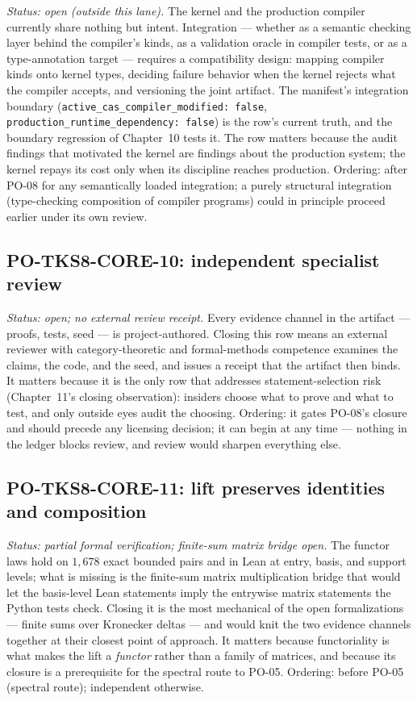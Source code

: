 \emph{Status: open (outside this lane).} The kernel and the
production compiler currently share nothing but intent. Integration
--- whether as a semantic checking layer behind the compiler's kinds,
as a validation oracle in compiler tests, or as a type-annotation
target --- requires a compatibility design: mapping compiler kinds
onto kernel types, deciding failure behavior when the kernel rejects
what the compiler accepts, and versioning the joint artifact. The
manifest's integration boundary (\texttt{active\_cas\_compiler\_modified:
false}, \texttt{production\_runtime\_dependency: false}) is the
row's current truth, and the boundary regression of Chapter~10 tests
it. The row matters because the audit findings that motivated the
kernel are findings about the production system; the kernel repays
its cost only when its discipline reaches production. Ordering: after
PO-08 for any semantically loaded integration; a purely structural
integration (type-checking composition of compiler programs) could
in principle proceed earlier under its own review.

\subsection{PO-TKS8-CORE-10: independent specialist review}

\emph{Status: open; no external review receipt.} Every evidence
channel in the artifact --- proofs, tests, seed --- is
project-authored. Closing this row means an external reviewer with
category-theoretic and formal-methods competence examines the claims,
the code, and the seed, and issues a receipt that the artifact then
binds. It matters because it is the only row that addresses
statement-selection risk (Chapter~11's closing observation): insiders
choose what to prove and what to test, and only outside eyes audit
the choosing. Ordering: it gates PO-08's closure and should precede
any licensing decision; it can begin at any time --- nothing in the
ledger blocks review, and review would sharpen everything else.

\subsection{PO-TKS8-CORE-11: lift preserves identities and composition}

\emph{Status: partial formal verification; finite-sum matrix bridge
open.} The functor laws hold on $1{,}678$ exact bounded pairs and in
Lean at entry, basis, and support levels; what is missing is the
finite-sum matrix multiplication bridge that would let the
basis-level Lean statements imply the entrywise matrix statements the
Python tests check. Closing it is the most mechanical of the open
formalizations --- finite sums over Kronecker deltas --- and would
knit the two evidence channels together at their closest point of
approach. It matters because functoriality is what makes the lift a
\emph{functor} rather than a family of matrices, and because its
closure is a prerequisite for the spectral route to PO-05. Ordering:
before PO-05 (spectral route); independent otherwise.

